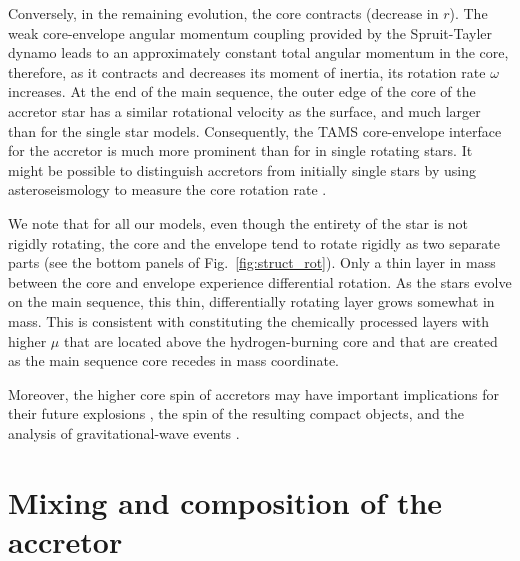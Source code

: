 \documentclass[twocolumn,twocolappendix,trackchanges]{aastex63}
\DeclareRobustCommand{\Figref}[1]{Fig.~\ref{#1}}
\begin{document}
Conversely, in the remaining evolution, the core contracts (decrease
in $r$). The weak core-envelope angular momentum coupling provided by
the Spruit-Tayler dynamo leads to an approximately constant total
angular momentum in the core, therefore, as it contracts and decreases
its moment of inertia, its rotation rate $\omega$ increases.  At the end of the main sequence, the outer edge of the
core of the accretor star has a similar rotational velocity as the
surface, and much larger than for the single star models.
Consequently, the TAMS core-envelope interface
for the accretor is much more prominent than for in single rotating
stars. It might be possible to distinguish accretors from
initially single stars by using asteroseismology to measure the core
rotation rate \citep[e.g.,][]{cantiello:14}.

We note that for all our models, even though the entirety of the star is not rigidly rotating, the core and the envelope tend to rotate rigidly as two separate parts (see the bottom panels of \Figref{fig:struct_rot}). Only a thin layer in mass between the core and envelope experience differential rotation. As the stars evolve on the main sequence, this thin, differentially rotating layer grows somewhat in mass. This is consistent with constituting the chemically processed layers with higher $\mu$ that are located above the hydrogen-burning core and that are created as the main sequence core recedes in mass coordinate.

Moreover, the higher core spin of accretors may have
important implications for their future explosions
\citep[e.g.][]{macfadyen:99, cantiello:07}, the spin of the
resulting compact objects, and the analysis of gravitational-wave
events \citep[e.g.,][]{zaldarriaga:18, qin:18, callister:21}.



\section{Mixing and composition of the accretor}
\label{sec:mixing}
\end{document}
